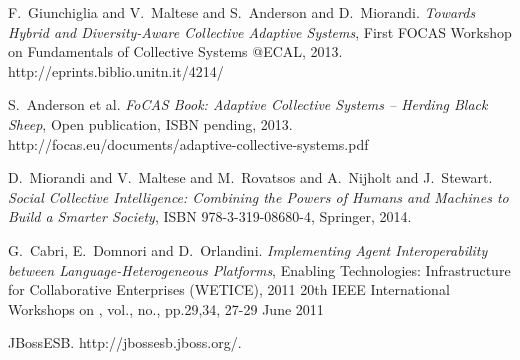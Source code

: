 \documentclass{llncs}
\begin{document}
%
%
%
\begin{thebibliography}{1}


F.~Giunchiglia and V.~Maltese and S.~Anderson and D.~Miorandi. \emph{Towards Hybrid and Diversity-Aware Collective Adaptive Systems}, First FOCAS Workshop on Fundamentals of Collective Systems @ECAL, 2013. http://eprints.biblio.unitn.it/4214/

S.~Anderson et al. \emph{FoCAS Book: Adaptive Collective Systems – Herding Black Sheep}, Open publication, ISBN pending, 2013. http://focas.eu/documents/adaptive-collective-systems.pdf

D.~Miorandi and V.~Maltese and M.~Rovatsos and A.~Nijholt and J.~Stewart. \emph{Social Collective Intelligence: Combining the Powers of Humans and Machines to Build a Smarter Society}, ISBN 978-3-319-08680-4, Springer, 2014.





G.~Cabri, E.~Domnori and D.~Orlandini. \emph{Implementing Agent Interoperability between Language-Heterogeneous Platforms}, Enabling Technologies: Infrastructure for Collaborative Enterprises (WETICE), 2011 20th IEEE International Workshops on , vol., no., pp.29,34, 27-29 June 2011

JBossESB. http://jbossesb.jboss.org/.


\end{thebibliography}
\end{document}
